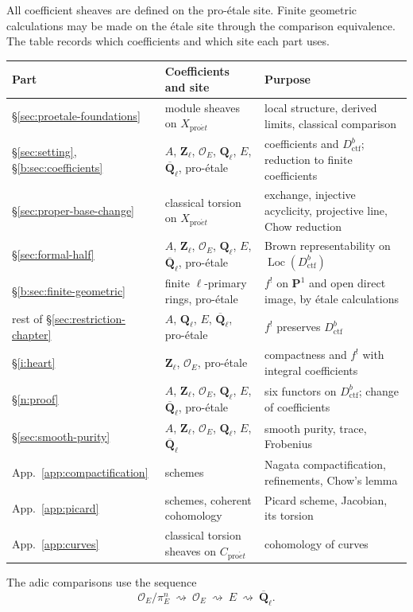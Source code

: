 \documentclass[11pt,a4paper]{article}
\numberwithin{equation}{section}
\theoremstyle{definition}
\theoremstyle{remark}
\newcommand{\Loc}{\operatorname{Loc}}
\newcommand{\Qbar}{\overline{\mathbf Q}_\ell}
\newcommand{\Ql}{\mathbf Q_\ell}
\newcommand{\Zl}{\mathbf Z_\ell}
\newcommand{\proet}{\mathrm{pro}\acute{e}t}
\newcommand{\PP}{\mathbf P}
\newcommand{\Dctf}{D^b_{\mathrm{ctf}}}
\begin{document}
All coefficient sheaves are defined on the pro-\'etale site. Finite
geometric calculations may be made on the \'etale site through the
comparison equivalence. The table records which coefficients and which
site each part uses.
\begin{center}
\small
\begin{tabular}{@{}p{}p{}p{}@{}}
\hline
Part & Coefficients and site & Purpose\\
\hline
\S\ref{sec:proetale-foundations}
 & module sheaves on $X_{\proet}$
 & local structure, derived limits, classical comparison\\
\S\ref{sec:setting}, \S\ref{b:sec:coefficients}
 & $A$, $\Zl$, $\mathcal O_E$, $\Ql$, $E$, $\Qbar$, pro-\'etale
 & coefficients and $\Dctf$; reduction to finite coefficients\\
\S\ref{sec:proper-base-change}
 & classical torsion on $X_{\proet}$
 & exchange, injective acyclicity, projective line, Chow reduction\\
\S\ref{sec:formal-half}
 & $A$, $\Zl$, $\mathcal O_E$, $\Ql$, $E$, $\Qbar$, pro-\'etale
 & Brown representability on $\Loc(\Dctf)$\\
\S\ref{b:sec:finite-geometric}
 & finite $\ell$-primary rings, pro-\'etale
 & $f^!$ on $\PP^1$ and open direct image, by \'etale calculations\\
rest of \S\ref{sec:restriction-chapter}
 & $A$, $\Ql$, $E$, $\Qbar$, pro-\'etale
 & $f^!$ preserves $\Dctf$\\
\S\ref{i:heart}
 & $\Zl$, $\mathcal O_E$, pro-\'etale
 & compactness and $f^!$ with integral coefficients\\
\S\ref{n:proof}
 & $A$, $\Zl$, $\mathcal O_E$, $\Ql$, $E$, $\Qbar$, pro-\'etale
 & six functors on $\Dctf$; change of coefficients\\
\S\ref{sec:smooth-purity}
 & $A$, $\Zl$, $\mathcal O_E$, $\Ql$, $E$, $\Qbar$
 & smooth purity, trace, Frobenius\\
App.~\ref{app:compactification}
 & schemes
 & Nagata compactification, refinements, Chow's lemma\\
App.~\ref{app:picard}
 & schemes, coherent cohomology
 & Picard scheme, Jacobian, its torsion\\
App.~\ref{app:curves}
 & classical torsion sheaves on $C_{\proet}$
 & cohomology of curves\\
\hline
\end{tabular}
\end{center}
The adic comparisons use the sequence
\[
 \mathcal O_E/\pi_E^n\ \rightsquigarrow\ \mathcal O_E
 \ \rightsquigarrow\ E\ \rightsquigarrow\ \Qbar .
\]
\end{document}
